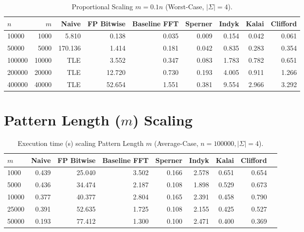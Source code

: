 \begin{table}[H]
\centering
\caption{Proportional Scaling $m = 0.1n$ (Worst-Case, $|\Sigma|=4$).}
\label{tab:prop_nm_data}
\begin{tabular}{@{}lrrrrrrrr@{}}
\toprule
$n$ & $m$ & Naive & FP Bitwise & Baseline FFT & Sperner & Indyk & Kalai & Clifford \\
\midrule
10000  & 1000 & 5.810  & 0.138 & 0.035 & 0.009 & 0.154 & 0.042 & 0.061 \\
50000  & 5000 & 170.136 & 1.414 & 0.181 & 0.042 & 0.835 & 0.283 & 0.354 \\
100000 & 10000 & {\footnotesize TLE}   & 3.552 & 0.347 & 0.083 & 1.783 & 0.782 & 0.651 \\
200000 & 20000 & {\footnotesize TLE}   & 12.720   & 0.730 & 0.193 & 4.005 & 0.911 & 1.266 \\
400000 & 40000 & {\footnotesize TLE}   & 52.654   & 1.551 & 0.381 & 9.554 & 2.966 & 3.292 \\
\bottomrule
\end{tabular}
\end{table}

\clearpage
\section{Pattern Length ($m$) Scaling}

\begin{table}[H]
\centering
\caption{Execution time (s) scaling Pattern Length $m$ (Average-Case, $n=100000, |\Sigma|=4$).}
\label{tab:app_mean_m_data}
\begin{tabular}{@{}lrrrrrrrr@{}}
\toprule
$m$ & Naive & FP Bitwise & Baseline FFT & Sperner & Indyk & Kalai & Clifford \\
\midrule
1000  & 0.439 & 25.040 & 3.502 & 0.166 & 2.578 & 0.651 & 0.654 \\
5000  & 0.436 & 34.474 & 2.187 & 0.108 & 1.898 & 0.529 & 0.673 \\
10000 & 0.377 & 40.377 & 2.804 & 0.165 & 2.391 & 0.458 & 0.790 \\
25000 & 0.391 & 52.635 & 1.725 & 0.108 & 2.155 & 0.425 & 0.527 \\
50000 & 0.193 & 77.412 & 1.300 & 0.100 & 2.471 & 0.400 & 0.369 \\
\bottomrule
\end{tabular}
\end{table}

